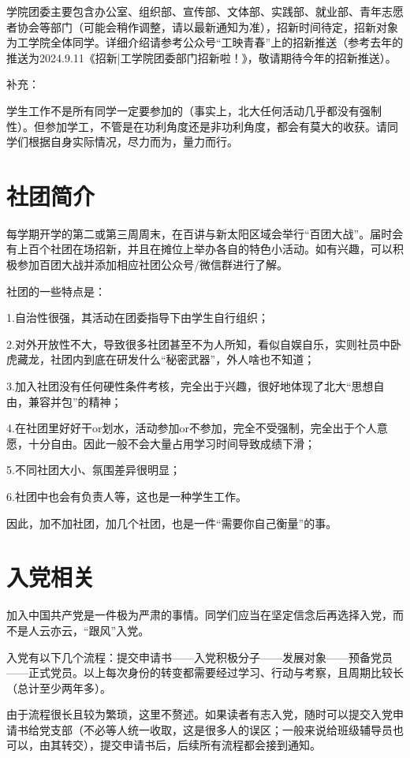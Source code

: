 \documentclass[11pt,oneside]{book}
\begin{document}
学院团委主要包含办公室、组织部、宣传部、文体部、实践部、就业部、青年志愿者协会等部门（可能会稍作调整，请以最新通知为准），招新时间待定，招新对象为工学院全体同学。详细介绍请参考公众号“工映青春”上的招新推送（参考去年的推送为2024.9.11《招新|工学院团委部门招新啦！》，敬请期待今年的招新推送）。

补充：

学生工作不是所有同学一定要参加的（事实上，北大任何活动几乎都没有强制性）。但参加学工，不管是在功利角度还是非功利角度，都会有莫大的收获。请同学们根据自身实际情况，尽力而为，量力而行。

\newpage

    \section{社团简介}
    每学期开学的第二或第三周周末，在百讲与新太阳区域会举行“百团大战”。届时会有上百个社团在场招新，并且在摊位上举办各自的特色小活动。如有兴趣，可以积极参加百团大战并添加相应社团公众号/微信群进行了解。

社团的一些特点是：

1.自治性很强，其活动在团委指导下由学生自行组织；

2.对外开放性不大，导致很多社团甚至不为人所知，看似自娱自乐，实则社员中卧虎藏龙，社团内到底在研发什么“秘密武器”，外人啥也不知道；

3.加入社团没有任何硬性条件考核，完全出于兴趣，很好地体现了北大“思想自由，兼容并包”的精神；

4.在社团里好好干or划水，活动参加or不参加，完全不受强制，完全出于个人意愿，十分自由。因此一般不会大量占用学习时间导致成绩下滑；

5.不同社团大小、氛围差异很明显；

6.社团中也会有负责人等，这也是一种学生工作。 

因此，加不加社团，加几个社团，也是一件“需要你自己衡量”的事。

    \section{入党相关}
加入中国共产党是一件极为严肃的事情。同学们应当在坚定信念后再选择入党，而不是人云亦云，“跟风”入党。

入党有以下几个流程：提交申请书——入党积极分子——发展对象——预备党员——正式党员。以上每次身份的转变都需要经过学习、行动与考察，且周期比较长（总计至少两年多）。

由于流程很长且较为繁琐，这里不赘述。如果读者有志入党，随时可以提交入党申请书给党支部（不必等人统一收取，这是很多人的误区；一般来说给班级辅导员也可以，由其转交），提交申请书后，后续所有流程都会接到通知。
\end{document}
